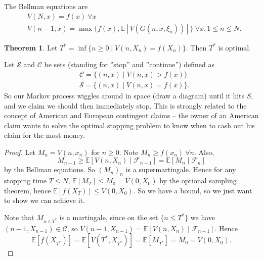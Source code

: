 \documentclass{article}
\theoremstyle{definition}
\newtheorem{theorem}{Theorem}[section]
\begin{document}
The Bellman equations are 
\begin{align*}
    &V(N,x)=f(x) ~\forall x\\
    &V(n-1,x) = \max \{f(x), \mathbb{E}[V(G(n,x,\xi_n))]\} ~\forall x, 1\le n\le N.
\end{align*}
\begin{theorem}
    Let $T^* = \inf \{n\ge 0 \mid V(n,X_n)=f(X_n)\}$. Then $T^*$ is optimal.
\end{theorem}
Let $\mathcal{S}$ and $\mathcal{C}$ be sets (standing for ''stop'' and ''continue'') defined as 
\begin{align*}
    &\mathcal{C}=\{(n,x) \mid V(n,x)>f(x)\}\\
    &\mathcal{S}=\{(n,x) \mid V(n,x)=f(x)\}.
\end{align*}
So our Markov process wiggles around in space (draw a diagram) until it hits $S$, and we claim we should then immediately stop. This is strongly related to the concept of American and European contingent claims -- the owner of an American claim wants to solve the optimal stopping problem to know when to cash out his claim for the most money.
\begin{proof}
    Let $M_n = V(n,x_n)$ for $n\ge 0$. Note $M_n \ge f(x_n) ~\forall n$. Also, \[
    M_{n-1} \ge \mathbb{E}[V(n,X_n) \mid \mathcal{F}_{n-1}] = \mathbb{E}[M_n \mid \mathcal{F}_n]
    \] by the Bellman equations. So $(M_n)_n$ is a supermartingale. Hence for any stopping time $T\le N$, $\mathbb{E}[M_T]\le M_0 = V(0,X_0)$ by the optional sampling theorem, hence $\mathbb{E}[f(X_T)]\le V(0,X_0)$. So we have a bound, so we just want to show we can achieve it.

    Note that $M_{n \wedge T^*}$ is a martingale, since on the set $\{n\le T^*\}$ we have $(n-1,X_{n-1}) \in \mathcal{C}$, so $V(n-1,X_{n-1})= \mathbb{E}[V(n,X_n) \mid \mathcal{F}_{n-1}]$. Hence \[
    \mathbb{E}[f(X_{T^*})] = \mathbb{E}[V(T^*,X_{T^*})] = \mathbb{E}[M_{T^*}] = M_0 = V(0,X_0).
    \]
\end{proof}
\end{document}
